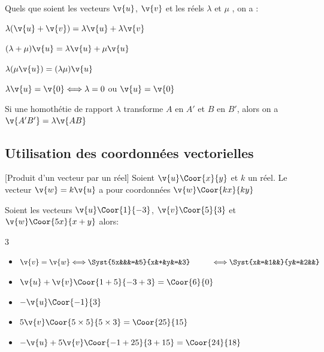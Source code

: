 \begin{prop}{}{}
Quels que soient les vecteurs $\v{u}$, $\v{v}$ et les réels $\lambda$ et $\mu$ , on a :
\begin{itemize}
\begin{minipage}{7cm}
\item  $\lambda(\v{u} + \v{v}) =  \lambda\v{u} + \lambda\v{v}$
\item  $(\lambda+\mu)\v{u}  =  \lambda\v{u} +\mu\v{u}$
\end{minipage}
\hspace{5mm}
\begin{minipage}{7cm}
\item  $\lambda(\mu\v{u})  =  (\lambda\mu)\v{u}$
\item  $\lambda\v{u}  = \v{0} \Longleftrightarrow \lambda=0$ ou $\v{u} =\v{0}$
\end{minipage}
\end{itemize}
\end{prop}

\begin{rem}{}{}
   Si une homothétie de rapport $\lambda$ transforme $A$ en $A'$ et $B$ en $B'$, alors on a $\v{A'B'}=\lambda\v{AB}$
\end{rem}

\subsection{Utilisation des coordonnées vectorielles}

\begin{prop}{}{}[Produit d'un vecteur par un réel]
    Soient $\v{u}\Coor{x}{y}$ et $k$ un réel. Le vecteur $\v{w}=k\v{u}$ a pour coordonnées $\v{w}\Coor{kx}{ky}$
\end{prop}

\begin{ex}{}{}
   Soient les vecteurs $\v{u}\Coor{1}{-3}$, $\v{v}\Coor{5}{3}$ et $\v{w}\Coor{5x}{x+y}$ alors:
   \begin{multicols}{3}
   \begin{itemize}
      \item  $\v{v}=\v{w} \Longleftrightarrow \Syst{5x&&&=&5}{x&+&y&=&3} \\ \hspace*{1cm} \Longleftrightarrow \Syst{x&=&1&&}{y&=&2&&}$
      \item  $\v{u}+\v{v}\Coor{1+5}{-3+3}=\Coor{6}{0}$
      \item  $-\v{u}\Coor{-1}{3}$
      \item  $5\v{v}\Coor{5\times 5}{5\times 3}=\Coor{25}{15}$
      \item  $-\v{u}+5\v{v}\Coor{-1+25}{3+15}=\Coor{24}{18}$
   \end{itemize}
   \end{multicols}
\end{ex}

